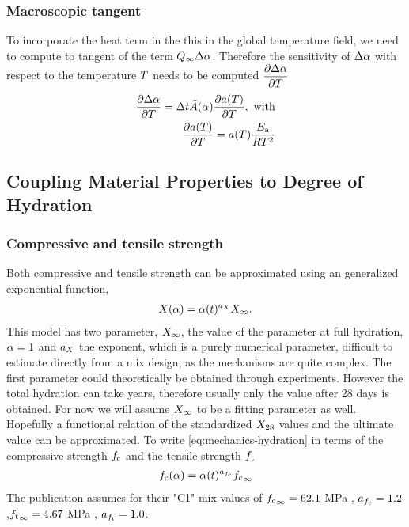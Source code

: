 \subsubsection{Macroscopic tangent}
To incorporate the heat term in the this in the global temperature field, we need to compute to tangent of the term $Q_{\infty}\Delta\alpha$.
Therefore the sensitivity of $\Delta\alpha$ with respect to the temperature $T$ needs to be computed $\dfrac{\partial \Delta\alpha}{\partial T}$
\begin{align}
	\dfrac{\partial \Delta\alpha}{\partial T} = \Delta t \tilde{A}(\alpha)\dfrac{\partial a(T)}{\partial T},\text{ with}\\
	\dfrac{\partial a(T)}{\partial T} = a(T) \frac{E_{\text{a}}}{RT^2}
\end{align}

\subsection{Coupling Material Properties to Degree of Hydration}
\subsubsection{Compressive and tensile strength}
Both compressive and tensile strength can be approximated using an generalized exponential function,
\begin{align}
	X(\alpha) = \alpha(t)^{a_X} X_\infty. \label{eq:mechanics-hydration}
\end{align}
This model has two parameter, $X_\infty$, the value of the parameter at full hydration, $\alpha = 1$ and $a_X$ the exponent, which is a purely numerical parameter, difficult to estimate directly from a mix design, as the mechanisms are quite complex.
The first parameter could theoretically be obtained through experiments.
However the total hydration can take years, therefore usually only the value after 28 days is obtained.
For now we will assume $X_\infty$ to be a fitting parameter as well.
Hopefully a functional relation of the standardized $X_{28}$ values and the ultimate value can be approximated.
To write \eqref{eq:mechanics-hydration} in terms of the compressive strength $f_{\text{c}}$ and the tensile strength $f_{\text{t}}$
\begin{align}
	f_{\text{c}}(\alpha) = \alpha(t)^{a_{f_{\text{c}}}} {f_{\text{c}}}_\infty \label{eq:fcwrtDOH}
\end{align}
The publication assumes for their "C1" mix values of  ${f_{\text{c}}}_\infty = 62.1$ MPa , $a_{f_{\text{c}}} = 1.2$,${f_{\text{t}}}_\infty = 4.67$ MPa , $a_{f_{\text{t}}} = 1.0$.

